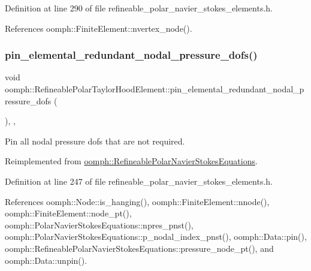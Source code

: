 Definition at line 290 of file refineable\+\_\+polar\+\_\+navier\+\_\+stokes\+\_\+elements.\+h.



References oomph\+::\+Finite\+Element\+::nvertex\+\_\+node().

\mbox{\label{classoomph_1_1RefineablePolarTaylorHoodElement_a6c4de6358f04635ecd54ef87487d7ada}} 
\subsubsection{\texorpdfstring{pin\+\_\+elemental\+\_\+redundant\+\_\+nodal\+\_\+pressure\+\_\+dofs()}{pin\_elemental\_redundant\_nodal\_pressure\_dofs()}}
{\footnotesize\ttfamily void oomph\+::\+Refineable\+Polar\+Taylor\+Hood\+Element\+::pin\+\_\+elemental\+\_\+redundant\+\_\+nodal\+\_\+pressure\+\_\+dofs (\begin{DoxyParamCaption}{ }\end{DoxyParamCaption})\hspace{0.3cm}{\ttfamily [inline]}, {\ttfamily [private]}, {\ttfamily [virtual]}}



Pin all nodal pressure dofs that are not required. 



Reimplemented from \hyperlink{classoomph_1_1RefineablePolarNavierStokesEquations_a29a784c096caf88d102b8fd13dc686e6}{oomph\+::\+Refineable\+Polar\+Navier\+Stokes\+Equations}.



Definition at line 247 of file refineable\+\_\+polar\+\_\+navier\+\_\+stokes\+\_\+elements.\+h.



References oomph\+::\+Node\+::is\+\_\+hanging(), oomph\+::\+Finite\+Element\+::nnode(), oomph\+::\+Finite\+Element\+::node\+\_\+pt(), oomph\+::\+Polar\+Navier\+Stokes\+Equations\+::npres\+\_\+pnst(), oomph\+::\+Polar\+Navier\+Stokes\+Equations\+::p\+\_\+nodal\+\_\+index\+\_\+pnst(), oomph\+::\+Data\+::pin(), oomph\+::\+Refineable\+Polar\+Navier\+Stokes\+Equations\+::pressure\+\_\+node\+\_\+pt(), and oomph\+::\+Data\+::unpin().

